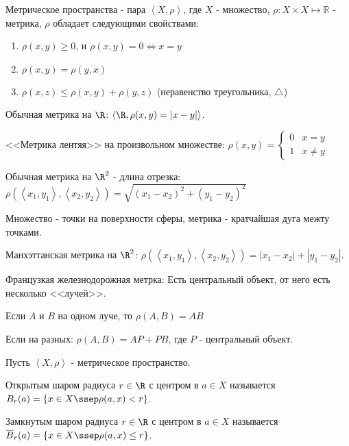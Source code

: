 \begin{definition} \thmslashn 

    Метрическое пространства - пара $\left<X, \rho\right>$, где $X$ - множество, $\rho : X \times X \mapsto \mathbb{R}$ - метрика, $\rho$ обладает следующими свойствами:

    \begin{enumerate}
        \item $\rho(x, y) \ge 0$, и $\rho(x, y) = 0 \iff x = y$
        \item $\rho(x, y) = \rho(y, x)$
        \item $\rho(x, z) \le \rho(x, y) + \rho(y, z)$ (неравенство треугольника, $\triangle$)
    \end{enumerate}
\end{definition}
\begin{example} \thmslashn

    Обычная метрика на $\R$: $\left<\R, \rho(x, y) = |x-y|\right>$.

    <<Метрика лентяя>> на произвольном множестве: 
    $\rho(x,y) = \begin{cases} 0 & x = y\\ 1 & x \neq y \end{cases}$ 

    Обычная метрика на $\R^2$ - длина отрезка: $\rho(\left<x_1, y_1\right>, \left<x_2, y_2\right>) = \sqrt{(x_1-x_2)^2+(y_1-y_2)^2} $

    Множество - точки на поверхности сферы, метрика - кратчайшая дуга межту точками.

    Манхэттанская метрика на $\R^2$: $\rho(\left<x_1, y_1\right>, \left<x_2, y_2\right>) = |x_1-x_2|+|y_1-y_2|$.

    Французкая железнодорожная метрка: Есть центральный объект, от него есть несколько <<лучей>>. 

    Если $A$ и $B$ на одном луче, то $\rho(A, B) = AB$

    Если на разных: $\rho(A, B) = AP + PB$, где $P$ - центральный объект.

\end{example}
\begin{definition} \thmslashn 

    Пусть $\left<X, \rho\right>$ - метрическое пространство.

    Открытым шаром радиуса $r\in \R$ с центром в $a\in X$ называется $B_r(a) = \{x\in X \ssep \rho(a, x) < r\}$.
    
    Замкнутым шаром радиуса $r\in \R$ с центром в $a\in X$ называется $\overline{B}_r(a) = \{x\in X \ssep \rho(a, x) \le  r\}$.
\end{definition}
